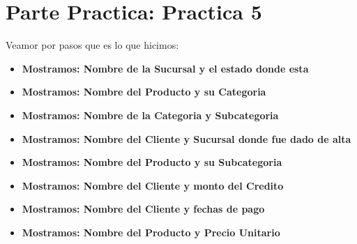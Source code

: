 \documentclass[12pt, fleqn]{article}                             %
\begin{document}
\clearpage
\section{Parte Practica: Practica 5}

    Veamor por pasos que es lo que hicimos:

    \begin{itemize}

        \item
            \textbf{Mostramos: Nombre de la Sucursal y el estado donde esta}
            

        \item
            \textbf{Mostramos: Nombre del Producto y su Categoria}
            

        \item
            \textbf{Mostramos: Nombre de la Categoria y Subcategoria}
            

        \item
            \textbf{Mostramos: Nombre del Cliente y Sucursal donde fue dado de alta}
            

        \item
            \textbf{Mostramos: Nombre del Producto y su Subcategoria}
            


        \item
            \textbf{Mostramos: Nombre del Cliente y monto del Credito}
            

        \item
            \textbf{Mostramos: Nombre del Cliente y fechas de pago}
            

        \item
            \textbf{Mostramos: Nombre del Producto y Precio Unitario}
            


\end{itemize}
\end{document}
